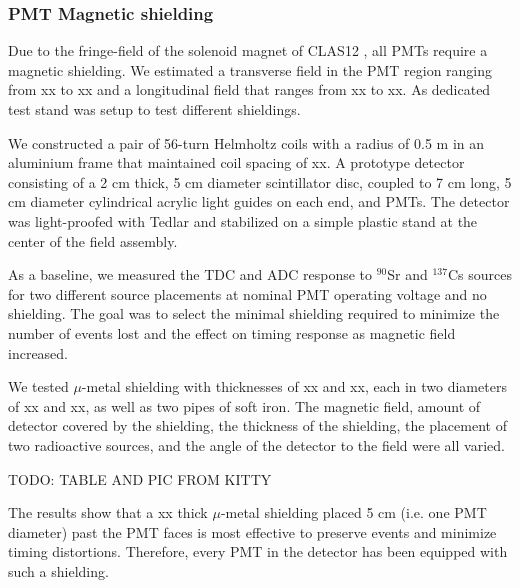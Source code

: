 \documentclass[3p,final,twocolumn]{elsarticle}
\begin{document}
\subsubsection{PMT Magnetic shielding}
Due to the fringe-field of the solenoid magnet of CLAS12 \cite{Fair:2020yfx}, all PMTs require a magnetic shielding. We estimated a transverse field in the  PMT region ranging from xx to xx and a longitudinal field that ranges from xx to xx. As dedicated test stand was setup to test different shieldings.

We constructed a pair of 56-turn Helmholtz coils with a radius of 0.5 \si{\meter} in an aluminium frame that maintained coil spacing of xx. A prototype detector consisting of a 2 \si{\centi\meter} thick, 5 \si{\centi\meter} diameter scintillator disc, coupled to 7 \si{\centi\meter} long, 5 \si{\centi\meter} diameter cylindrical acrylic light guides on each end, and PMTs. The detector was light-proofed with Tedlar and stabilized on a simple plastic stand at the center of the field assembly. 

As a baseline, we measured the TDC and ADC response to $^{90}$Sr and $^{137}$Cs sources for two different source placements at nominal PMT operating voltage and no shielding. 
The goal was to select the minimal shielding required to minimize the number of events lost and the effect on timing response as  magnetic field increased.

We tested $\mu$-metal shielding with thicknesses of xx and xx, each in two diameters of xx and xx, as well as two pipes of soft iron. The magnetic field, amount of detector covered by the shielding, the thickness of the shielding, the placement of two radioactive sources, and the angle of the detector to the field were all varied. 


{\color{red}TODO: TABLE AND PIC FROM KITTY}


The results show that a xx thick $\mu$-metal shielding placed 5 \si{\centi\meter} (i.e. one PMT diameter) past the PMT faces is most effective to preserve events and minimize timing distortions. Therefore, every PMT in the detector has been equipped with such a shielding. 
\end{document}

